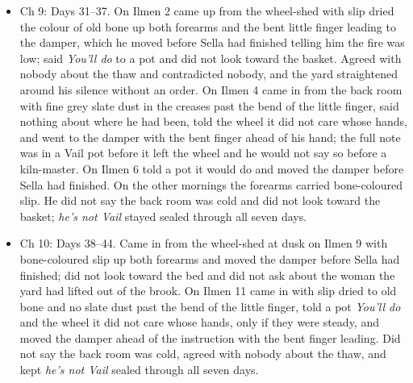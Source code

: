 \documentclass{design/chronicle}
\begin{document}
{\begin{itemize}[leftmargin=1.4em,itemsep=1pt,topsep=3pt,parsep=0pt]
\end{itemize}

\begin{itemize}[leftmargin=1.4em,itemsep=1pt,topsep=3pt,parsep=0pt]

\item Ch 9: Days 31–37. On Ilmen 2 came up from the wheel-shed with slip dried the colour of old bone up both forearms and the bent little finger leading to the damper, which he moved before Sella had finished telling him the fire was low; said \emph{You’ll do} to a pot and did not look toward the basket. Agreed with nobody about the thaw and contradicted nobody, and the yard straightened around his silence without an order. On Ilmen 4 came in from the back room with fine grey slate dust in the creases past the bend of the little finger, said nothing about where he had been, told the wheel it did not care whose hands, and went to the damper with the bent finger ahead of his hand; the full note was in a Vail pot before it left the wheel and he would not say so before a kiln-master. On Ilmen 6 told a pot it would do and moved the damper before Sella had finished. On the other mornings the forearms carried bone-coloured slip. He did not say the back room was cold and did not look toward the basket; \emph{he’s not Vail} stayed sealed through all seven days.

\end{itemize}

\begin{itemize}[leftmargin=1.4em,itemsep=1pt,topsep=3pt,parsep=0pt]

\item Ch 10: Days 38–44. Came in from the wheel-shed at dusk on Ilmen 9 with bone-coloured slip up both forearms and moved the damper before Sella had finished; did not look toward the bed and did not ask about the woman the yard had lifted out of the brook. On Ilmen 11 came in with slip dried to old bone and no slate dust past the bend of the little finger, told a pot \emph{You’ll do} and the wheel it did not care whose hands, only if they were steady, and moved the damper ahead of the instruction with the bent finger leading. Did not say the back room was cold, agreed with nobody about the thaw, and kept \emph{he’s not Vail} sealed through all seven days.

\end{itemize}
}
\end{document}
